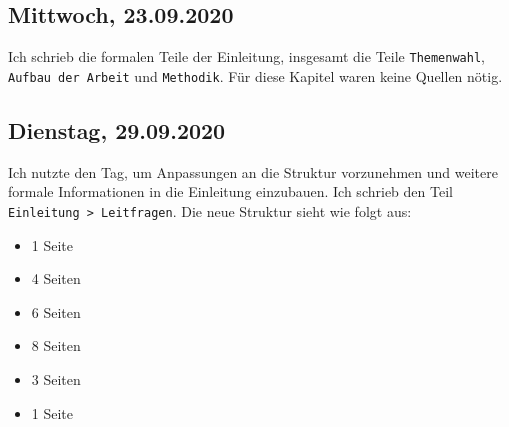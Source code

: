 \documentclass[../main.tex]{subfiles}
\begin{document}
	
	\subsection{Mittwoch, 23.09.2020}
	Ich schrieb die formalen Teile der Einleitung, insgesamt die Teile \texttt{Themenwahl}, \texttt{Aufbau der Arbeit} und \texttt{Methodik}.
	Für diese Kapitel waren keine Quellen nötig.
	
	
	\subsection{Dienstag, 29.09.2020}
	Ich nutzte den Tag, um Anpassungen an die Struktur vorzunehmen und weitere formale Informationen in die Einleitung einzubauen.
	Ich schrieb den Teil \texttt{Einleitung > Leitfragen}.
	Die neue Struktur sieht wie folgt aus:
	\begin{singlespace}
	\noindent
	\begin{itemize}
		\item {} 1 Seite
		\item {} 4 Seiten
		\item {} 6 Seiten
		\item {} 8 Seiten
		\item {} 3 Seiten
		\item {} 1 Seite
	\end{itemize}
	\end{singlespace}
	
\end{document}

